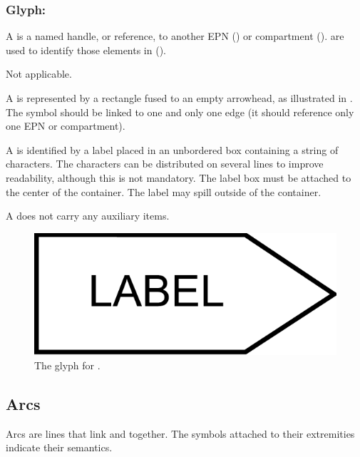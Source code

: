 \subsubsection{Glyph: }
\label{sec:tag}

A  is a named handle, or reference, to another EPN () or compartment ().   are used to identify those elements in  ().

\begin{glyphDescription}

\glyphSboTerm Not applicable.

\glyphContainer A  is represented by a rectangle fused to an empty arrowhead, as illustrated in .  The symbol should be linked to one and only one edge (\ie it should reference only one EPN or compartment).

\glyphLabel A  is identified by a label placed in an unbordered box containing a string of characters.  The characters can be distributed on several lines to improve readability, although this is not mandatory.  The label box must be attached to the center of the container. The label may spill outside of the container.

\glyphAux A  does not carry any auxiliary items. 

\end{glyphDescription}

\begin{figure}[H]
  \centering
  \includegraphics[scale = 0.3]{images/tag}
  \caption{The \PD glyph for .}
  \label{fig:tag}
\end{figure}

\subsection{Arcs}\label{sec:arcs}

Arcs are lines that link  and  together.  The symbols attached to their extremities indicate their semantics.


